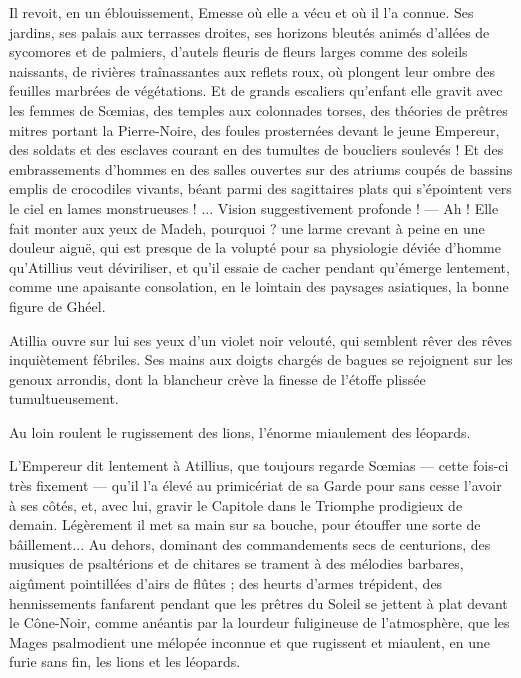 \documentclass[a4paper, 11pt, oneside, polutonikogreek, french]{article}
\begin{document}
Il revoit, en un éblouissement, Emesse où elle a vécu et où il l'a connue. Ses jardins, ses palais aux terrasses droites, ses horizons bleutés animés d'allées de sycomores et de palmiers, d'autels fleuris de fleurs larges comme des soleils naissants, de rivières traînassantes aux reflets roux, où plongent leur ombre des feuilles marbrées de végétations. Et de grands escaliers qu'enfant elle gravit avec les femmes de Sœmias, des temples aux colonnades torses, des théories de prêtres mitres portant la Pierre-Noire, des foules prosternées devant le jeune Empereur, des soldats et des esclaves courant en des tumultes de boucliers soulevés ! Et des embrassements d'hommes en des salles ouvertes sur des atriums coupés de bassins emplis de crocodiles vivants, béant parmi des sagittaires plats qui s'épointent vers le ciel en lames monstrueuses ! ... Vision suggestivement profonde ! --- Ah ! Elle fait monter aux yeux de Madeh, pourquoi ? une larme crevant à peine en une douleur aiguë, qui est presque de la volupté pour sa physiologie déviée d'homme qu'Atillius veut déviriliser, et qu'il essaie de cacher pendant qu'émerge lentement, comme une apaisante consolation, en le lointain des paysages asiatiques, la bonne figure de Ghéel.

Atillia ouvre sur lui ses yeux d'un violet noir velouté, qui semblent rêver des rêves inquiètement fébriles. Ses mains aux doigts chargés de bagues se rejoignent sur les genoux arrondis, dont la blancheur crève la finesse de l'étoffe plissée tumultueusement.

Au loin roulent le rugissement des lions, l'énorme miaulement des léopards.

L'Empereur dit lentement à Atillius, que toujours regarde Sœmias --- cette fois-ci très fixement --- qu'il l'a élevé au primicériat de sa Garde pour sans cesse l'avoir à ses côtés, et, avec lui, gravir le Capitole dans le Triomphe prodigieux de demain. Légèrement il met sa main sur sa bouche, pour étouffer une sorte de bâillement... Au dehors, dominant des commandements secs de centurions, des musiques de psaltérions et de chitares se trament à des mélodies barbares, aigûment pointillées d'airs de flûtes ; des heurts d'armes trépident, des hennissements fanfarent pendant que les prêtres du Soleil se jettent à plat devant le Cône-Noir, comme anéantis par la lourdeur fuligineuse de l'atmosphère, que les Mages psalmodient une mélopée inconnue et que rugissent et miaulent, en une furie sans fin, les lions et les léopards.
\clearpage
\subsection{}
\end{document}
